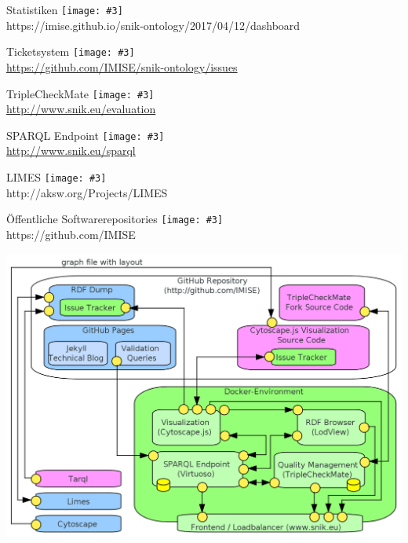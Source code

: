 \documentclass{beamer}
\newcommand{\imageslide}[4][]
{
\begin{frame}{#2}
\centering\texttt{[image: \#3]}
\\#1
\note{#4}
\end{frame}
}
\begin{document}
\imageslide[https://imise.github.io/snik-ontology/2017/04/12/dashboard]{Statistiken}{img/dashboard-medley.png}{}
\imageslide[\url{https://github.com/IMISE/snik-ontology/issues}]{Ticketsystem}{img/gitissue.png}{}
\imageslide[\url{http://www.snik.eu/evaluation}]{TripleCheckMate}{img/triplecheckmate.png}{}



\imageslide[\url{http://www.snik.eu/sparql}]{SPARQL Endpoint}{img/sparqlresult.png}{}

\imageslide[http://aksw.org/Projects/LIMES]{LIMES}{img/limes.png}{}

\imageslide[https://github.com/IMISE]{Öffentliche Softwarerepositories}{img/github.png}{}



\begin{frame}
\includegraphics[width=\textwidth]{img/architecture.png}
\end{frame}
\end{document}
